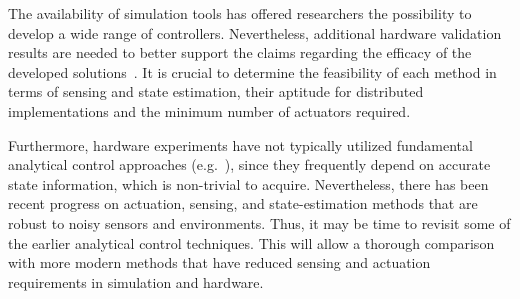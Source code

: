 The availability of simulation tools has offered researchers the
possibility to develop a wide range of controllers.  Nevertheless,
additional hardware validation results are needed to better support
the claims regarding the efficacy of the developed
solutions~\cite{Mirletz2015, Caluwaerts2013rsif}.  It is crucial to
determine the feasibility of each method in terms of sensing and state
estimation, their aptitude for distributed implementations and the
minimum number of actuators required.

Furthermore, hardware experiments have not typically utilized
fundamental analytical control approaches (e.g.~\cite{sultan2002}),
since they frequently depend on accurate state information, which is
non-trivial to acquire.  Nevertheless, there has been recent progress
on actuation, sensing, and state-estimation methods that are robust to
noisy sensors and environments.  Thus, it may be time to revisit some
of the earlier analytical control techniques. This will allow a
thorough comparison with more modern methods that have reduced sensing
and actuation requirements in simulation and hardware.




